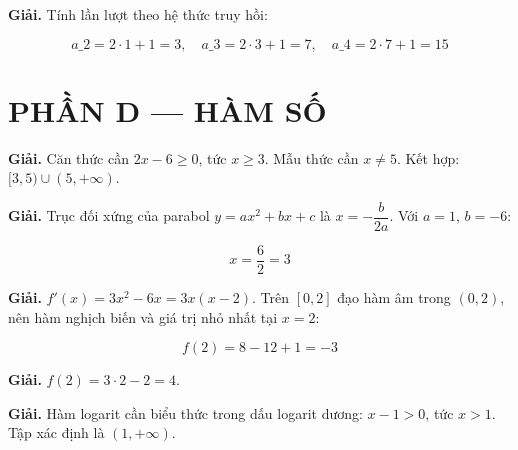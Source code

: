 \documentclass[11pt, a4paper]{article}
\begin{document}
\begin{dapan}[25 — Đáp án A]

\textbf{Giải.} Tính lần lượt theo hệ thức truy hồi:

$$a\_2 = 2 \cdot 1 + 1 = 3, \quad a\_3 = 2 \cdot 3 + 1 = 7, \quad a\_4 = 2 \cdot 7 + 1 = 15$$

\section{PHẦN D — HÀM SỐ}


\end{dapan}
\vspace{0.3cm}
\begin{dapan}[26 — Đáp án C]

\textbf{Giải.} Căn thức cần $2x - 6 \ge 0$, tức $x \ge 3$. Mẫu thức cần $x \ne 5$. Kết hợp: $[3, 5) \cup (5, +\infty)$.


\end{dapan}
\vspace{0.3cm}
\begin{dapan}[27 — Đáp án A]

\textbf{Giải.} Trục đối xứng của parabol $y = ax^2 + bx + c$ là $x = -\dfrac{b}{2a}$. Với $a = 1$, $b = -6$:

$$x = \dfrac{6}{2} = 3$$


\end{dapan}
\vspace{0.3cm}
\begin{dapan}[28 — Đáp án D]

\textbf{Giải.} $f'(x) = 3x^2 - 6x = 3x(x - 2)$. Trên $[0, 2]$ đạo hàm âm trong $(0, 2)$, nên hàm nghịch biến và giá trị nhỏ nhất tại $x = 2$:

$$f(2) = 8 - 12 + 1 = -3$$


\end{dapan}
\vspace{0.3cm}
\begin{dapan}[29 — Đáp án D]

\textbf{Giải.} $f(2) = 3 \cdot 2 - 2 = 4$.


\end{dapan}
\vspace{0.3cm}
\begin{dapan}[30 — Đáp án A]

\textbf{Giải.} Hàm logarit cần biểu thức trong dấu logarit dương: $x - 1 > 0$, tức $x > 1$. Tập xác định là $(1, +\infty)$.


\end{dapan}
\vspace{0.3cm}
\end{document}
